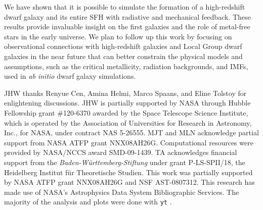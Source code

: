 \documentclass[apjl]{emulateapj}
\begin{document}
We have shown that it is possible to simulate the formation of a
high-redshift dwarf galaxy and its entire SFH with radiative and
mechanical feedback.  These results provide invaluable insight on the
first galaxies and the role of metal-free stars in the early universe.
We plan to follow up this work by focusing on observational
connections with high-redshift galaxies and Local Group dwarf galaxies
in the near future that can better constrain the physical models and
assumptions, such as the critical metallicity, radiation backgrounds,
and IMFs, used in \textit{ab initio} dwarf galaxy simulations.

\acknowledgments

JHW thanks Renyue Cen, Amina Helmi, Marco Spaans, and Eline Tolstoy
for enlightening discussions.  JHW is partially supported by NASA
through Hubble Fellowship grant \#120-6370 awarded by the Space
Telescope Science Institute, which is operated by the Association of
Universities for Research in Astronomy, Inc., for NASA, under contract
NAS 5-26555.  MJT and MLN acknowledge partial support from NASA ATFP
grant NNX08AH26G.  Computational resources were provided by NASA/NCCS
award SMD-09-1439.  TA acknowledges financial support from the {\em
  Baden-W\"{u}rttemberg-Stiftung} under grant P-LS-SPII/18, the
Heidelberg Institut f\"ur Theoretische Studien. This work was
partially supported by NASA ATFP grant NNX08AH26G and NSF
AST-0807312. This research has made use of NASA’s Astrophysics Data
System Bibliographic Services.  The majority of the analysis and plots
were done with \texttt{yt} \citep{yt_full_paper}.

%

\end{document}
